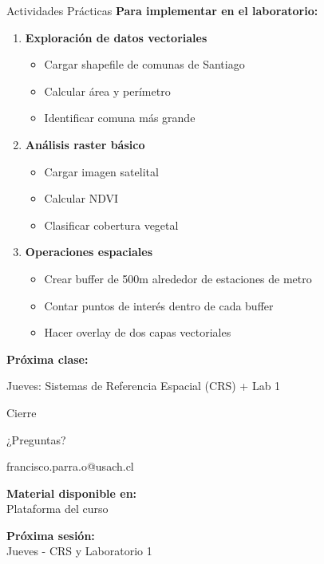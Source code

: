 \documentclass[10pt]{beamer}
\begin{document}
\begin{frame}{Actividades Prácticas}
    \textbf{Para implementar en el laboratorio:}
    
    \begin{enumerate}
        \item \textbf{Exploración de datos vectoriales}
        \begin{itemize}
            \item Cargar shapefile de comunas de Santiago
            \item Calcular área y perímetro
            \item Identificar comuna más grande
        \end{itemize}
        
        \item \textbf{Análisis raster básico}
        \begin{itemize}
            \item Cargar imagen satelital
            \item Calcular NDVI
            \item Clasificar cobertura vegetal
        \end{itemize}
        
        \item \textbf{Operaciones espaciales}
        \begin{itemize}
            \item Crear buffer de 500m alrededor de estaciones de metro
            \item Contar puntos de interés dentro de cada buffer
            \item Hacer overlay de dos capas vectoriales
        \end{itemize}
    \end{enumerate}
    
    \vspace{0.3cm}
    
    \textbf{Próxima clase:} 
    \begin{tcolorbox}[colframe=usachblue,colback=blue!5]
        Jueves: Sistemas de Referencia Espacial (CRS) + Lab 1
    \end{tcolorbox}
\end{frame}

\begin{frame}{Cierre}
    \begin{center}
        \Large{¿Preguntas?}
        
        \vspace{1cm}
        
        francisco.parra.o@usach.cl
        
        \vspace{0.5cm}
        
        \textbf{Material disponible en:}\\
        Plataforma del curso
        
        \vspace{0.5cm}
        
        \textbf{Próxima sesión:}\\
        Jueves - CRS y Laboratorio 1
    \end{center}
\end{frame}
\end{document}
